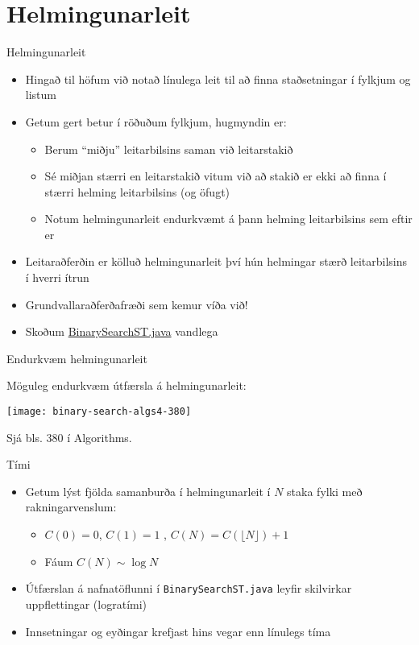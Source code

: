 \documentclass{beamer}
\begin{document}
\section{Helmingunarleit}

\begin{frame}{Helmingunarleit}
\begin{itemize}
 \item Hingað til höfum við notað línulega leit til að finna staðsetningar í fylkjum og listum
 \item Getum gert betur í röðuðum fylkjum, hugmyndin er:
 \begin{itemize}
  \item Berum ``miðju'' leitarbilsins saman við leitarstakið
  \item Sé miðjan stærri en leitarstakið vitum við að stakið er ekki að finna í stærri helming leitarbilsins (og öfugt)
  \item Notum helmingunarleit endurkvæmt á þann helming leitarbilsins sem eftir er
 \end{itemize}
 \item Leitaraðferðin er kölluð helmingunarleit  því hún helmingar stærð leitarbilsins í hverri ítrun
 \item Grundvallaraðferðafræði sem kemur víða við!
 \item Skoðum \href{http://algs4.cs.princeton.edu/code/edu/princeton/cs/algs4/BinarySearchST.java.html}{BinarySearchST.java} vandlega
\end{itemize}
\end{frame}

\begin{frame}{Endurkvæm helmingunarleit}
\begin{center}
Möguleg endurkvæm útfærsla á helmingunarleit:

\texttt{[image: binary-search-algs4-380]}
\end{center}
Sjá bls. 380 í Algorithms.
\end{frame}


\begin{frame}{Tími}
\begin{itemize}
 \item Getum lýst fjölda samanburða í helmingunarleit í $N$ staka fylki með rakningarvenslum:
 \begin{itemize}
  \item $C(0) = 0$, $C(1) = 1$ , $C(N) = C(\lfloor N \rfloor)+1$
  \item Fáum $C(N) \sim \log N$
 \end{itemize}
 \item Útfærslan á nafnatöflunni í \texttt{BinarySearchST.java} leyfir skilvirkar uppflettingar (logratími)
 \item Innsetningar og eyðingar krefjast hins vegar enn línulegs tíma
\end{itemize}
\end{frame}
\end{document}
